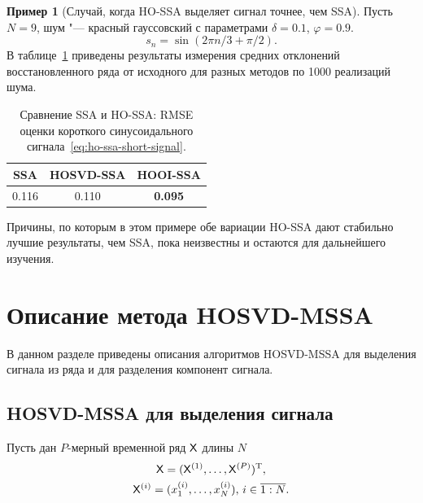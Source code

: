 \documentclass[specialist,
    substylefile = spbu.rtx,
    subf,href,colorlinks=true, 12pt]{disser}
\theoremstyle{plain}
\theoremstyle{definition}
\newtheorem{example}{Пример}[section]
\theoremstyle{remark}
\begin{document}
    \FloatBarrier

    \begin{example}[Случай, когда HO-SSA выделяет сигнал точнее, чем SSA]
        Пусть $N = 9$, шум "--- красный гауссовский с параметрами $\delta = 0.1$, $\varphi = 0.9$.
        \begin{equation}
            \label{eq:ho-ssa-short-signal}
            s_n = \sin(2\pi n/3 + \pi /2).
        \end{equation}
        В таблице~\ref{tab:tssa-better-ssa} приведены результаты измерения средних отклонений восстановленного ряда от исходного
        для разных методов по 1000 реализаций шума.

        \begin{table}[!ht]
            \centering
            \caption{Сравнение SSA и HO-SSA: RMSE оценки короткого синусоидального
            сигнала~\eqref{eq:ho-ssa-short-signal}.}
            \begin{tabular}{ccc}
                \hline
                SSA   & HOSVD-SSA & HOOI-SSA       \\
                \hline
                0.116 & 0.110     & \textbf{0.095} \\
                \hline
            \end{tabular}\label{tab:tssa-better-ssa}
        \end{table}

        Причины, по которым в этом примере обе вариации HO-SSA дают стабильно лучшие результаты, чем SSA, пока неизвестны
        и остаются для дальнейшего изучения.
    \end{example}


    \section{Описание метода HOSVD-MSSA}\label{sec:Tensor-MSSA-method-description}
    В данном разделе приведены описания алгоритмов HOSVD-MSSA для выделения сигнала из ряда и для разделения компонент сигнала.
    \subsection{HOSVD-MSSA для выделения сигнала}\label{subsec:Tensor-MSSA-method-signal-description}
    Пусть дан $P$-мерный временной ряд $\mathsf{X}$ длины $N$
    \begin{gather*}
        \mathsf{X} = (\mathsf{X}^{(1)}, \ldots, \mathsf{X}^{(P)})^{\mathrm{T}},\\
        \mathsf{X}^{(i)} = (x_1^{(i)}, \ldots, x_N^{(i)}),\, i \in \overline{1:N}.
    \end{gather*}
\end{document}

